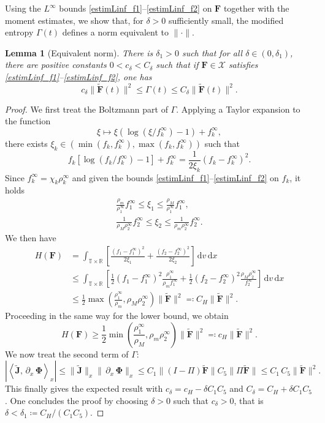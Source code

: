 \documentclass[reqno]{amsart}
\newtheorem{Lemma}{Lemma}
\newcommand{\dx}{\,\partial_x\, }
\newcommand{\dd}{\,\mathrm{d}}
\newcommand{\R}{\mathbb{R}}
\newcommand{\T}{\mathbb{T}}
\newcommand{\Ft}{{\widetilde{F}}}
\newcommand{\Jt}{\widetilde{J}}
\newcommand{\Ftbf}{\mathbf{\Ft}}
\newcommand{\Fbf}{\mathbf{F}}
\newcommand{\Phibf}{\boldsymbol{\Phi}}
\newcommand{\Jtbf}{\mathbf{\Jt}}
\newcommand{\lla}{\left\langle}
\newcommand{\rra}{\right\rangle}
\numberwithin{equation}{section}
\begin{document}
Using the $L^\infty$ bounds \eqref{estimLinf_f1}--\eqref{estimLinf_f2} on $\Fbf$ together with the moment estimates, we show that, for $\delta>0$ sufficiently small, the modified entropy $\Gamma(t)$ defines a norm equivalent to $\|\cdot\|$.

\begin{Lemma}[Equivalent norm]\label{lem.normeq}
    There is $\delta_1>0$ such that for all $\delta\in (0,\delta_1)$, there are positive constants $0<c_\delta<C_\delta$ such that if $\Fbf\in\mathcal{X}$ satisfies \eqref{estimLinf_f1}--\eqref{estimLinf_f2}, one has
    \[c_\delta\|\Ftbf(t)\|^2\leq \Gamma(t)\leq C_\delta\|\Ftbf(t)\|^2.\] 
\end{Lemma}
\begin{proof}
    We first treat the Boltzmann part of $\Gamma$. Applying a Taylor expansion to the function 
    \[ \xi\mapsto \xi\left(\log\left(\xi/f_k^\infty\right)-1\right)+f_k^\infty, \]
    there exists $\xi_k \in \left ( \min(f_k,f_k^\infty),\max(f_k,f_k^\infty)\right)$ such that
    \[f_k\left[\log\left(f_k/f_k^\infty\right)-1\right]+f_k^\infty=\frac{1}{2\xi_k}(f_k-f_k^\infty)^2.\]
    Since $f_k^\infty=\chi_k\rho_k^\infty$ and given the bounds \eqref{estimLinf_f1}--\eqref{estimLinf_f2} on $f_k$, it holds %
    \begin{gather*}
        \frac{\rho_m}{\rho_1^\infty}f_1^\infty\leq \xi_1\leq\frac{\rho_M}{\rho_1^\infty}f_1^\infty,\\
        \frac{1}{\rho_M\rho_2^\infty}f_2^\infty\leq \xi_2\leq \frac{1}{\rho_m\rho_2^\infty}f_2^\infty.
    \end{gather*}
    We then have
    \begin{align*}
        H(\Fbf)&=\int_{\T\times\R}\left[\frac{(f_1-f_1^\infty)^2}{2\xi_1}+\frac{(f_2-f_2^\infty)^2}{2\xi_2}\right]\dd v \dd x\\
        &\leq \int_{\T\times\R}\left[\frac{1}{2}(f_1-f_1^\infty)^2\frac{\rho_1^\infty}{\rho_m f_1^\infty}+\frac{1}{2}(f_2-f_2^\infty)^2\frac{\rho_M\rho_2^\infty}{f_2^\infty}\right] \dd v \dd x\\
        &\leq \frac{1}{2}\max \left(\frac{\rho_1^\infty}{\rho_m},\rho_M\rho_2^\infty\right)\|\Ftbf\|^2\eqcolon C_H\|\Ftbf\|^2.
    \end{align*}
    Proceeding in the same way for the lower bound, we obtain
    \begin{equation*}
        H(\Fbf)\geq \frac{1}{2}\min\left(\frac{\rho_1^\infty}{\rho_M},\rho_m\rho_2^\infty\right)\|\Ftbf\|^2\eqcolon c_H\|\Ftbf\|^2.
    \end{equation*}
    We now treat the second term of $\Gamma$:
    \[
    \left|\lla \Jtbf,\dx\Phibf\rra_x\right|\leq \|\Jtbf\|_x\|\dx\Phibf\|_x\leq C_1\|(I-\Pi)\Ftbf\|C_5\|\Pi\Ftbf\|\leq C_1\,C_5\|\Ftbf\|^2.
    \]
    This finally gives the expected result with $c_\delta=c_H-\delta C_1C_5$ and $C_\delta=C_H+\delta C_1C_5$. One concludes the proof by choosing $\delta>0$ such that $c_\delta>0$, that is $\delta <\delta_1\coloneq  C_H/(C_1C_5)$.
\end{proof}
\end{document}
